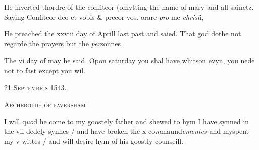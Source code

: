 \documentclass[12pt, a4paper]{book}
\begin{document}
			
               		
		\ifthenelse{\isodd{\thepage}}
		{\reversemarginpar}
		{\normalmarginpar}
		He inverted thordre of the confiteor (omytting
 the name of mary and all sainctz. Saying
 Confiteor deo et vobis \& precor vos. orare \textit{pro} me \textit{christ}i,
               	
               	
               		
		\ifthenelse{\isodd{\thepage}}
		{\reversemarginpar}
		{\normalmarginpar}
		He preached the xxviii day of Aprill last past
 and saied. That god dothe not regarde the
 prayers but the \textit{per}sonnes,
               	
               	
               		
				\marginpar[\vspace{0.5cm}{\textcolor{Gray}{fastynge}}]{}
			
               		
		\ifthenelse{\isodd{\thepage}}
		{\reversemarginpar}
		{\normalmarginpar}
		The vi day of may he said. Opon saturday you shal have whitson
 evyn, you nede not to fast except you wil.
			
               	
 

            
            
               
				\begin{center} \begin{large} {\scshape 
                  21 Septembris 1543.} \end{large} \end{center}
			
               
               	
				\begin{center}  {\scshape Archebolde of faversham}  \end{center}
			

               	
               		
				\marginpar[\vspace{0.5cm}{\textcolor{Gray}{Confession}}]{}
			
               		
		\ifthenelse{\isodd{\thepage}}
		{\reversemarginpar}
		{\normalmarginpar}
		I will q\textit{uo}d he come to my goostely father and shewed to hym
  I have synned in the vii dedely synnes / and have broken
 the x co\textit{m}maund\textit{ementes} and myspent my v wittes / and will
 desire hym of his goostly counseill.
\end{document}
